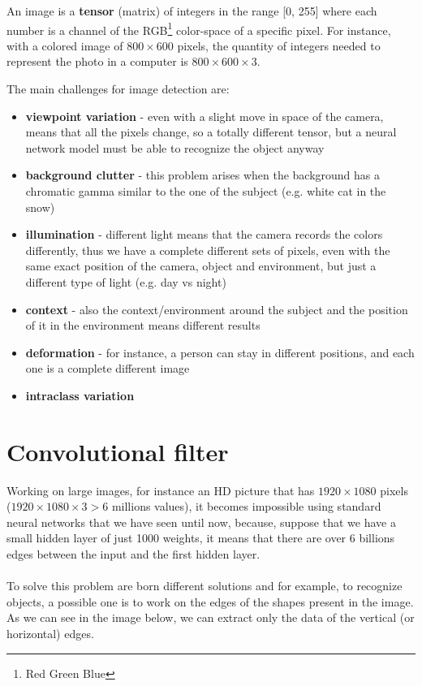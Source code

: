 \documentclass[oneside]{academica}
\begin{document}
An image is a \textbf{tensor} (matrix) of integers in the range [0, 255] where each number is a channel of the RGB\footnote{Red Green Blue} color-space of a specific pixel. For instance, with a colored image of $800 \times 600$ pixels, the quantity of integers needed to represent the photo in a computer is $800 \times 600 \times 3$.

The main challenges for image detection are:
\begin{itemize}
  \item \textbf{viewpoint variation} - even with a slight move in space of the camera, means that all the pixels change, so a totally different tensor, but a neural network model must be able to recognize the object anyway
  \item \textbf{background clutter} - this problem arises when the background has a chromatic gamma similar to the one of the subject (e.g. white cat in the snow)
  \item \textbf{illumination} - different light means that the camera records the colors differently, thus we have a complete different sets of pixels, even with the same exact position of the camera, object and environment, but just a different type of light (e.g. day vs night)
  \item \textbf{context} - also the context/environment around the subject and the position of it in the environment means different results
  \item \textbf{deformation} - for instance, a person can stay in different positions, and each one is a complete different image
  \item \textbf{intraclass variation}
\end{itemize}

\section{Convolutional filter}

Working on large images, for instance an HD picture that has $1920 \times 1080$ pixels ($1920 \times 1080 \times 3 > 6$ millions values), it becomes impossible using standard neural networks that we have seen until now, because, suppose that we have a small hidden layer of just 1000 weights, it means that there are over 6 billions edges between the input and the first hidden layer.
\\\\
To solve this problem are born different solutions and for example, to recognize objects, a possible one is to work on the edges of the shapes present in the image.
As we can see in the image below, we can extract only the data of the vertical (or horizontal) edges.
\end{document}
